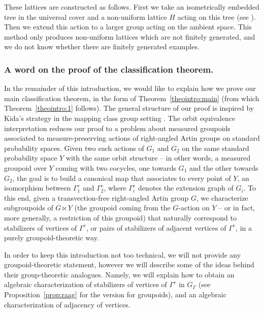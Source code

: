 These lattices are constructed as follows. First we take an isometrically embedded tree in the universal cover and a non-uniform lattice $H$ acting on this tree (see \eg \cite{bass2001tree}). Then we extend this action to a larger group acting on the ambient space. This method only produces non-uniform lattices which are not finitely generated, and we do not know whether there are finitely generated examples.

\subsubsection*{A word on the proof of the classification theorem.}
In the remainder of this introduction, we would like to explain how we prove our main classification theorem, in the form of Theorem~\ref{theointro:main} (from which Theorem~\ref{theointro:1} follows). The general structure of our proof is inspired by Kida's strategy in the mapping class group setting \cite{Kid}. The orbit equivalence interpretation reduces our proof to a problem about measured groupoids associated to measure-preserving actions of right-angled Artin groups on standard probability spaces. Given two such actions of $G_1$ and $G_2$ on the same standard probability space $Y$ with the same orbit structure -- in other words, a measured groupoid over $Y$ coming with two cocycles, one towards $G_1$ and the other towards $G_2$, the goal is to build a canonical map that associates to every point of $Y$, an isomorphism between $\Gamma^e_1$ and $\Gamma_2^e$, where $\Gamma^e_i$ denotes the extension graph of $G_i$. To this end, given a transvection-free right-angled Artin group $G$, we characterize subgroupoids of $G\ltimes Y$ (the groupoid coming from the $G$-action on $Y$ -- or in fact, more generally, a restriction of this groupoid) that naturally correspond to stabilizers of vertices of $\Gamma^e$, or pairs of stabilizers of adjacent vertices of $\Gamma^e$, in a purely groupoid-theoretic way.

In order to keep this introduction not too technical, we will not provide any groupoid-theoretic statement, however we will describe some of the ideas behind their group-theoretic analogues. Namely, we will explain how to obtain an algebraic characterization of stabilizers of vertices of $\Gamma^e$ in $G_\Gamma$ (see Proposition~\ref{prop:raag} for the version for groupoids), and an algebraic characterization of adjacency of vertices.

